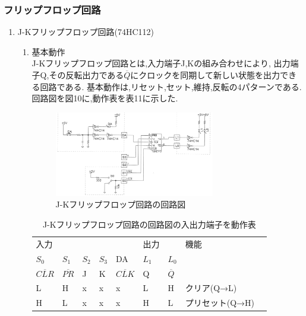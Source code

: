 \documentclass[twocolumn, 10pt,a4j]{jsarticle}
\begin{document}
  \subsubsection{フリップフロップ回路}
    \begin{enumerate}
      \item J-Kフリップフロップ回路(74HC112)
        \begin{enumerate}
          \item 基本動作 \\
            J-Kフリップフロップ回路とは,入力端子J,Kの組み合わせにより,
            出力端子Q,その反転出力である$\overline{Q}$にクロックを同期して新しい状態を出力できる回路である.
            基本動作は,リセット,セット,維持,反転の4パターンである.回路図を図10に,動作表を表11に示した.
            \begin{figure}[H]
              \begin{center}
                \includegraphics[width=7cm]{../img/junjokairo/jk_flip_flop.png}
                \caption{J-Kフリップフロップ回路の回路図}
              \end{center}
            \end{figure}
            \begin{table}[H]
              \centering
              \caption{J-Kフリップフロップ回路の回路図の入出力端子を動作表}
              \label{my-label}
                \footnotesize
                \begin{tabular}{lllll|ll|ll}
                入力      &         &         &         &     & 出力      &         & 機能        \\ \cline{1-7}
                $S_{0}$ & $S_{1}$ & $S_{2}$ & $S_{3}$ & DA  & $L_{1}$ & $L_{0}$ &               \\ \cline{1-7}
                $\overline{CLR}$  & $\overline{PR}$   & J   & K       & $\overline{CLK}$ & Q & $\overline{Q}$ &  \\ \hline
                L       & H       & x       & x       & x   & L       & H       & クリア(Q→L)  \\
                H       & L       & x       & x       & x   & H       & L       & プリセット(Q→H)  \\

\end{tabular}
\end{table}
\end{enumerate}
\end{enumerate}
\end{document}
